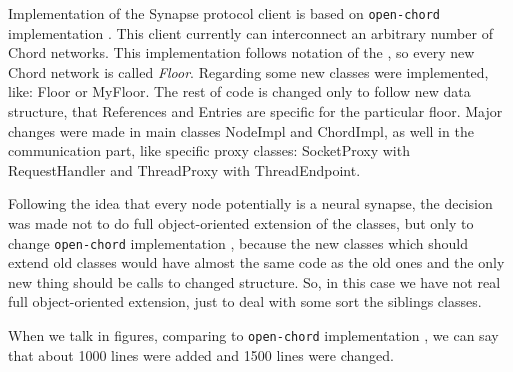 Implementation of the Synapse protocol client is based on \texttt{open-chord} implementation
\cite{Bamberg-SW}. This client currently can interconnect an arbitrary number of Chord networks. This
implementation follows notation of the \cite{LTB09}, so every new Chord network is called \textit{Floor}.
Regarding \cite{Bamberg-SW} some new classes were implemented, like: Floor or MyFloor. The rest of code
is changed only to follow new data structure, that References and Entries are specific for the particular
floor. Major changes were made in main classes NodeImpl and ChordImpl, as well in the communication part,
like specific proxy classes: SocketProxy with RequestHandler and ThreadProxy with ThreadEndpoint.

Following the idea that every node potentially is a neural synapse, the decision was made not to do full
object-oriented extension of the classes, but only to change \texttt{open-chord}  implementation
\cite{Bamberg-SW}, because the new classes which should extend old classes would have  almost the
same code as the old ones and the only new thing should be calls to changed structure. So,  in this
case we have not real full object-oriented extension, just to deal with some sort the siblings
classes.

When we talk in figures, comparing to \texttt{open-chord} implementation
\cite{Bamberg-SW}, we can say that about 1000 lines were added and 1500 lines were changed.